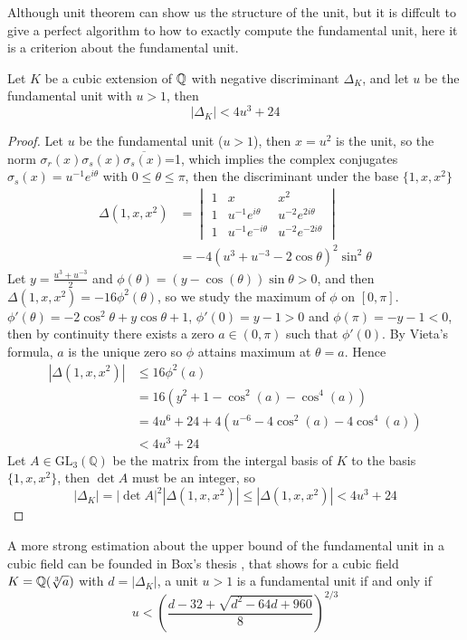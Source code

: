 Although unit theorem can show us the structure of the unit, but it is diffcult to give a perfect algorithm to how to exactly compute the fundamental unit, here it is a criterion about the fundamental unit.
\begin{lemma}[Artin] \label{criterion}
    Let \(K\) be a cubic extension of \(\mathbb{Q}\) with negative discriminant \(\Delta_K\), and let \(u\) be the fundamental unit with \(u>1\), then 
    \[|\Delta_K| < 4 u^3 + 24\]
    \begin{proof}
        Let \(u\) be the fundamental unit (\(u>1\)), then \(x=u^2\) is the unit, so the norm \(\sigma_r(x) \sigma_s(x) \overline{\sigma_s(x)}\)=1, which implies the complex conjugates \(\sigma_s(x)=u^{-1}e^{i\theta}\) with \(0 \leq \theta \leq \pi\), then the discriminant under the base \(\{1,x,x^2\}\)
        \begin{align*}
            \Delta(1,x,x^2) &= \begin{vmatrix}
                1 & x & x^2 \\
                1 & u^{-1}e^{i\theta} & u^{-2}e^{2i\theta}\\
                1 & u^{-1}e^{-i\theta} & u^{-2}e^{-2i\theta}
            \end{vmatrix}\\
            &= -4(u^3+u^{-3}-2\cos\theta)^2\sin^2\theta
        \end{align*}
        Let \(y=\frac{u^3+u^{-3}}{2}\) and \(\phi(\theta) = (y-\cos(\theta))\sin\theta>0\), and then \(\Delta(1,x,x^2) = -16\phi^2(\theta)\), so we study the maximum of \(\phi\) on \([0,\pi]\). \(\phi'(\theta) = -2\cos^2{\theta}+y\cos\theta+1\), \(\phi'(0)=y-1 > 0\) and \(\phi(\pi)=-y-1<0\), then by continuity there exists a zero \(a\in(0,\pi)\) such that \(\phi'(0)\). By Vieta's formula, \(a\) is the unique zero so \(\phi\) attains maximum at \(\theta=a\). Hence 
        \begin{align*}
            |\Delta(1,x,x^2)| &\leq 16\phi^2(a) \\
            &= 16(y^2+1-\cos^2(a)-\cos^4(a)) \\
            &= 4u^6+24+4(u^{-6}-4\cos^2(a)-4\cos^4(a)) \\
            &< 4u^3+24
        \end{align*}
        Let \(A \in \mathrm{GL}_3(\mathbb{Q})\) be the matrix from the intergal basis of \(K\) to the basis \(\{1,x,x^2\}\), then \(\det A\) must be an integer, so 
        \[|\Delta_K| = |\det A|^2 |\Delta(1,x,x^2)| \leq |\Delta(1,x,x^2)|<4u^3+24\]
    \end{proof}
\end{lemma}

A more strong estimation about the upper bound of the fundamental unit in a cubic field can be founded in Box's thesis \cite[Theorem 1.82]{box2014introduction}, that shows for a cubic field \(K = \mathbb{Q}(\sqrt[3]{a})\) with \(d = |\Delta_K|\), a unit \(u>1\) is a fundamental unit if and only if 
\[u < (\frac{d-32+\sqrt{d^2-64d+960}}{8})^{2/3}\]
